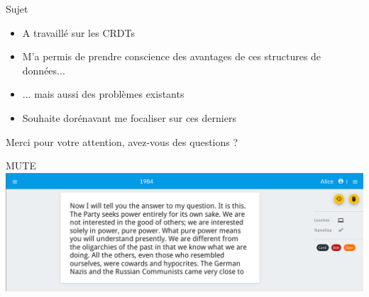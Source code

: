 \documentclass[xcolor=table]{beamer}
\begin{document}
\begin{frame}{Sujet}
  \begin{itemize}
  \item A travaillé sur les CRDTs 
  \item M'a permis de prendre conscience des avantages de ces structures de données...
  \item ... mais aussi des problèmes existants
  \item Souhaite dorénavant me focaliser sur ces derniers
  \end{itemize}
\end{frame}

\begin{frame}[standout]
  Merci pour votre attention, avez-vous des questions ?
\end{frame}

\appendix

\begin{frame}{MUTE}
  \includegraphics[scale=0.28]{fig/MUTE.png}
\end{frame}
\end{document}
